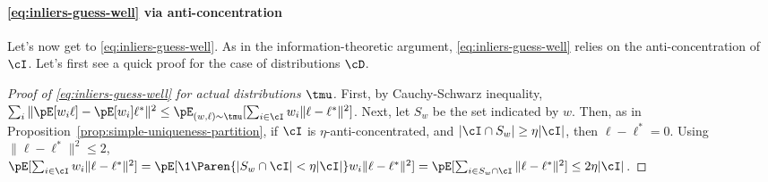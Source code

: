 \paragraph{\eqref{eq:inliers-guess-well} via anti-concentration} Let's now get to \eqref{eq:inliers-guess-well}. 
As in the information-theoretic argument, \eqref{eq:inliers-guess-well} relies on the anti-concentration of $\cI$.
Let's first see a quick proof for the case of distributions $\cD$.

\begin{proof}[Proof of \eqref{eq:inliers-guess-well} for actual distributions $\tmu$]
First, by Cauchy-Schwarz inequality, $\sum_i \|\pE[w_i \ell] - \pE[w_i] \ell^*\|^2 \leq \pE_{(w,\ell) \sim \tmu} [\sum_{i \in \cI} w_i \|\ell - \ell^*\|^2]$. 
Next, let $S_w$ be the set indicated by $w$. 
Then, as in Proposition~\ref{prop:simple-uniqueness-partition}, if $\cI$ is $\eta$-anti-concentrated, and $|\cI \cap S_w| \geq \eta |\cI|$, then $\ell-\ell^*= 0$. Using $\|\ell-\ell^*\|^2 \leq 2$, \\$\pE [\sum_{i \in \cI} w_i \|\ell - \ell^*\|^2] = \pE [\1\Paren{|S_w \cap \cI|< \eta |\cI|}w_i \|\ell - \ell^*\|^2] = \pE [\sum_{i \in S_w \cap \cI} \|\ell - \ell^*\|^2]  \leq 2\eta |\cI|$.
\end{proof}






